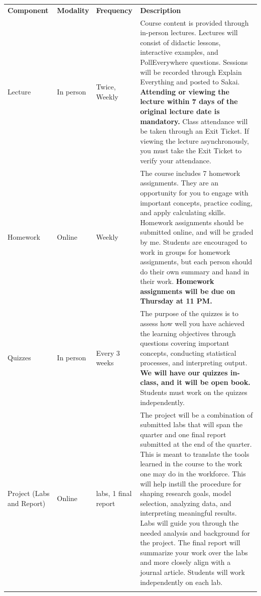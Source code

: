 \documentclass[
  letterpaper,
  DIV=11,
  numbers=noendperiod]{scrartcl}
\begin{document}
\begin{longtable}[]{@{}
  >{\centering\arraybackslash}p{}
  >{\centering\arraybackslash}p{}
  >{\centering\arraybackslash}p{}
  >{\raggedright\arraybackslash}p{}@{}}
\toprule\noalign{}
\endhead
\bottomrule\noalign{}
\endlastfoot
\textbf{Component} & \textbf{Modality} & \textbf{Frequency} &
\textbf{Description} \\
Lecture & In person & Twice, Weekly & Course content is provided through
in-person lectures. Lectures will consist of didactic lessons,
interactive examples, and PollEverywhere questions. Sessions will be
recorded through Explain Everything and posted to Sakai.
\textbf{Attending or viewing the lecture within 7 days of the original
lecture date is mandatory.} Class attendance will be taken through an
Exit Ticket. If viewing the lecture asynchronously, you must take the
Exit Ticket to verify your attendance. \\
Homework & Online & Weekly & The course includes 7 homework assignments.
They are an opportunity for you to engage with important concepts,
practice coding, and apply calculating skills. Homework assignments
should be submitted online, and will be graded by me. Students are
encouraged to work in groups for homework assignments, but each person
should do their own summary and hand in their work. \textbf{Homework
assignments will be due on Thursday at 11 PM.} \\
Quizzes & In person & Every 3 weeks & The purpose of the quizzes is to
assess how well you have achieved the learning objectives through
questions covering important concepts, conducting statistical processes,
and interpreting output. \textbf{We will have our quizzes in-class, and
it will be open book.} Students must work on the quizzes
independently. \\
Project (Labs and Report) & Online & 4 labs, 1 final report & The
project will be a combination of submitted labs that will span the
quarter and one final report submitted at the end of the quarter. This
is meant to translate the tools learned in the course to the work one
may do in the workforce. This will help instill the procedure for
shaping research goals, model selection, analyzing data, and
interpreting meaningful results. Labs will guide you through the needed
analysis and background for the project. The final report will summarize
your work over the labs and more closely align with a journal article.
Students will work independently on each lab. \\
& & & \\
\end{longtable}
\end{document}
